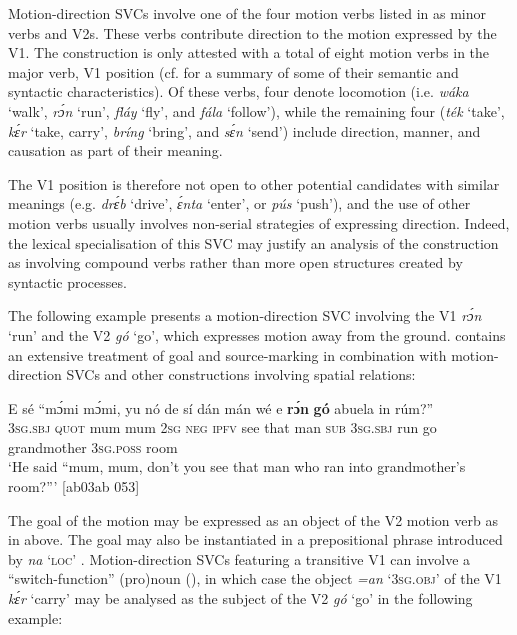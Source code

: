 Motion-direction SVCs involve one of the four motion{\fff} verbs listed in  as minor verbs and V2s. These verbs contribute direction to the motion expressed by the V1. The construction is only attested with a total of eight motion verbs in the major verb, V1 position (cf.  for a summary of some of their semantic and syntactic characteristics). Of these verbs, four denote locomotion (i.e. \textit{wáka} ‘walk’, \textit{rɔ́n} ‘run’, \textit{fláy} ‘fly’, and \textit{fála} ‘follow’), while the remaining four (\textit{ték} ‘take’, \textit{kɛ́r} ‘take, carry’, \textit{bríng} ‘bring’, and \textit{sɛ́n} ‘send’) include direction, manner, and causation as part of their meaning. 


The V1 position is therefore not open to other potential candidates with similar meanings (e.g. \textit{drɛ́b} ‘drive’, \textit{ɛ́nta} ‘enter’, or \textit{pús} ‘push’), and the use of other motion verbs usually involves non-serial strategies of expressing direction. Indeed, the lexical specialisation of this SVC may justify an analysis of the construction as involving compound verbs {\fff}rather than more open structures created by syntactic processes. 


\largerpage
The following example presents a motion-direction SVC involving the V1 \textit{rɔ́n} ‘run’ and the V2 \textit{gó} ‘go’, which expresses motion away from the ground.  contains an extensive treatment of goal and source-marking in combination with motion-direction SVCs and other constructions involving spatial relations:



\ea%
    \label{ex:key:1543}
    \gll E    sé    “mɔ́mi  mɔ́mi,  yu  nó  de  sí  dán  mán    wé  e
\textbf{rɔ́n}    \textbf{gó}  abuela    in    rúm?”\\
\textsc{3sg.sbj}  \textsc{quot}     mum  mum  \textsc{2sg}  \textsc{neg}  \textsc{ipfv}  see  that  man    \textsc{sub}  \textsc{3sg.sbj}
run    go  grandmother  \textsc{3sg.poss}  room\\

\glt ‘He said “mum, mum, don’t you see that man who ran into 
grandmother’s room?”’ [ab03ab 053]
\z

The goal of the motion may be expressed as an object of the V2 motion verb as in  above. The goal may also be instantiated in a prepositional phrase introduced by \textit{na} ‘\textsc{loc}’ . Motion{\fff}-direction SVCs featuring a transitive V1 can involve a “switch-function{\fff}” (pro)noun (\citealt[14–15]{Aikhenvald2006}), in which case the object \textit{=an} ‘\textsc{3sg.obj}’ of the V1 \textit{kɛ́r} ‘carry’ may be analysed as the subject{\fff} of the V2 \textit{gó} ‘go’ in the following example:


